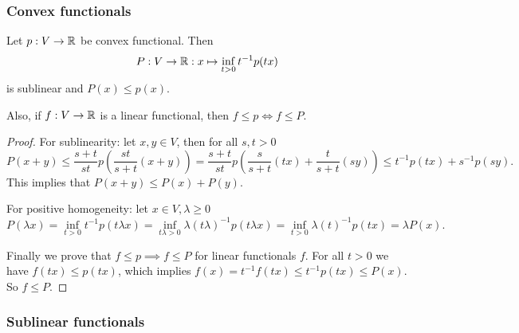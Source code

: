\subsubsection{Convex functionals}

\begin{proposition}
Let $p: V\to\mathbb{R}$ be convex functional. Then
\[ P: V\to\mathbb{R}: x\mapsto \inf_{t>0} t^{-1}p(tx) \]
is sublinear and $P(x)\leq p(x)$.

Also, if $f:V\to \mathbb{R}$ is a linear functional, then $f\leq p \iff f\leq P$.
\end{proposition}
\begin{proof}
For sublinearity: let $x,y\in V$, then for all $s,t>0$
\[ P(x+y) \leq \frac{s+t}{st}p\left(\frac{st}{s+t}(x+y)\right) = \frac{s+t}{st}p\left(\frac{s}{s+t}(tx)+\frac{t}{s+t}(sy)\right) \leq t^{-1}p(tx) + s^{-1}p(sy). \]
This implies that $P(x+y)\leq P(x)+P(y)$.

For positive homogeneity: let $x\in V,\lambda\geq 0$
\[ P(\lambda x) = \inf_{t>0} t^{-1}p(t\lambda x) = \inf_{t\lambda>0} \lambda (t\lambda)^{-1}p(t\lambda x) = \inf_{t>0} \lambda (t)^{-1}p(tx) = \lambda P(x). \]

Finally we prove that $f\leq p \implies f\leq P$ for linear functionals $f$. For all $t>0$ we have $f(tx) \leq p(tx)$, which implies $f(x) = t^{-1}f(tx) \leq t^{-1}p(tx) \leq P(x)$. So $f\leq P$.
\end{proof}

\subsubsection{Sublinear functionals}

